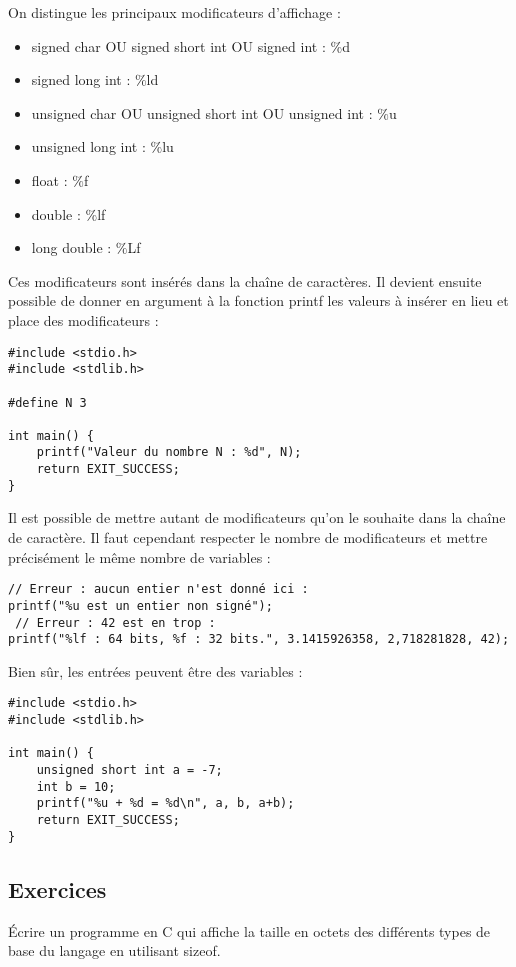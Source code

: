 \documentclass[../../../main.tex]{subfiles}
\begin{document}
On distingue les principaux modificateurs d'affichage :
\begin{itemize}
	\item \textsf{signed char} OU \textsf{signed short int} OU \textsf{signed int} : \textsf{$\%$d}
	\item \textsf{signed long int} : \textsf{$\%$ld}
	\item \textsf{unsigned char} OU \textsf{unsigned short int} OU \textsf{unsigned int} : \textsf{$\%$u}
	\item \textsf{unsigned long int} : \textsf{$\%$lu}
	\item \textsf{float} : \textsf{$\%$f}
	\item \textsf{double} : \textsf{$\%$lf}
	\item \textsf{long double} : \textsf{$\%$Lf}
\end{itemize}
Ces modificateurs sont insérés dans la chaîne de caractères. Il devient ensuite possible de donner en argument à la fonction \textsf{printf} les valeurs à insérer en lieu et place des modificateurs :
\begin{verbatim}
#include <stdio.h>
#include <stdlib.h>

#define N 3

int main() {
	printf("Valeur du nombre N : %d", N);
	return EXIT_SUCCESS;
}
\end{verbatim}
Il est possible de mettre autant de modificateurs qu'on le souhaite dans la chaîne de caractère. Il faut cependant respecter le nombre de modificateurs et mettre précisément le même nombre de variables :
\begin{verbatim}
// Erreur : aucun entier n'est donné ici :
printf("%u est un entier non signé"); 
 // Erreur : 42 est en trop :
printf("%lf : 64 bits, %f : 32 bits.", 3.1415926358, 2,718281828, 42);
\end{verbatim}
Bien sûr, les entrées peuvent être des variables :
\begin{verbatim}
#include <stdio.h>
#include <stdlib.h>

int main() {
	unsigned short int a = -7;
	int b = 10;
	printf("%u + %d = %d\n", a, b, a+b);
	return EXIT_SUCCESS;
}
\end{verbatim}
\subsection{Exercices}
Écrire un programme en C qui affiche la taille en octets des différents types de base du langage en utilisant \textsf{sizeof}.
\end{document}
